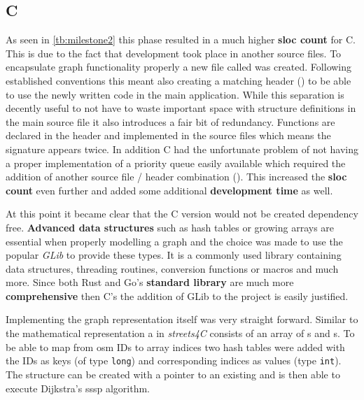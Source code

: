 \subsection{C}
\label{subsec:Implementation::Graph_Representation::C}

As seen in \autoref{tb:milestone2} this phase resulted in a much higher \textbf{\gls{sloc} count} for C. This is due to the fact that development took place in another source files. To encapsulate graph functionality properly a new file called  was created. Following established conventions this meant also creating a matching header () to be able to use the newly written code in the main application. While this separation is decently useful to not have to waste important space with structure definitions in the main source file it also introduces a fair bit of redundancy. Functions are declared in the header and implemented in the source files which means the signature appears twice. In addition C had the unfortunate problem of not having a proper implementation of a priority queue easily available which required the addition of another source file / header combination (). This increased the \textbf{\gls{sloc} count} even further and added some additional \textbf{development time} as well.

At this point it became clear that the C version would not be created dependency free. \textbf{Advanced data structures} such as hash tables or growing arrays are essential when properly modelling a graph and the choice was made to use the popular \textit{GLib} to provide these types. It is a commonly used library containing data structures, threading routines, conversion functions or macros and much more. Since both Rust and Go's \textbf{standard library} are much more \textbf{comprehensive} then C's the addition of GLib to the project is easily justified.

Implementing the graph representation itself was very straight forward. Similar to the mathematical representation a  in \textit{streets4C} consists of an array of s and s. To be able to map from \gls{osm} IDs to array indices two hash tables were added with the IDs as keys (of type \lstinline[style=c]{long}) and corresponding indices as values (type \lstinline[style=c]{int}). The  structure can be created with a pointer to an existing  and is then able to execute Dijkstra's \acrshort{sssp} algorithm.
\\


